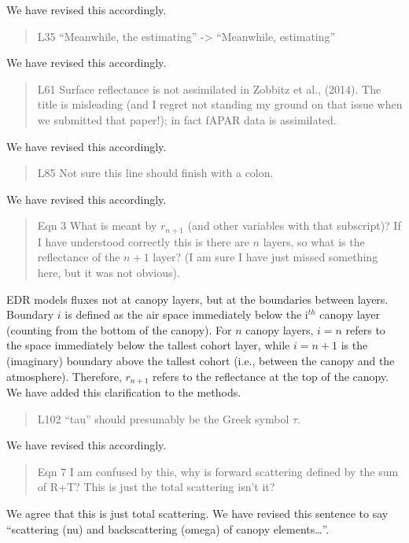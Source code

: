 We have revised this accordingly.

\begin{quote}
L35 “Meanwhile, the estimating” -> “Meanwhile, estimating”
\end{quote}

We have revised this accordingly.

\begin{quote}
L61 Surface reflectance is not assimilated in Zobbitz et al., (2014). The title is misleading (and I regret not standing my ground on that issue when we submitted that paper!); in fact fAPAR data is assimilated.
\end{quote}

We have revised this accordingly.

\begin{quote}
L85 Not sure this line should finish with a colon.
\end{quote}

We have revised this accordingly.

\begin{quote}
Eqn 3 What is meant by $r_{n+1}$ (and other variables with that subscript)? If I have understood correctly this is there are $n$ layers, so what is the reflectance of the $n + 1$ layer? (I am sure I have just missed something here, but it was not obvious).
\end{quote}

EDR models fluxes not at canopy layers, but at the boundaries between layers. Boundary $i$ is defined as the air space immediately below the i$^{th}$ canopy layer (counting from the bottom of the canopy). For $n$ canopy layers, $i = n$ refers to the space immediately below the tallest cohort layer, while $i = n+1$ is the (imaginary) boundary above the tallest cohort (i.e., between the canopy and the atmosphere). Therefore, $r_{n+1}$ refers to the reflectance at the top of the canopy. We have added this clarification to the methods.

\begin{quote}
L102 “tau” should presumably be the Greek symbol $\tau$.
\end{quote}

We have revised this accordingly.

\begin{quote}
Eqn 7 I am confused by this, why is forward scattering defined by the sum of R+T? This is just the total scattering isn’t it?
\end{quote}

We agree that this is just total scattering. We have revised this sentence to say “scattering (nu) and backscattering (omega) of canopy elements…”.

